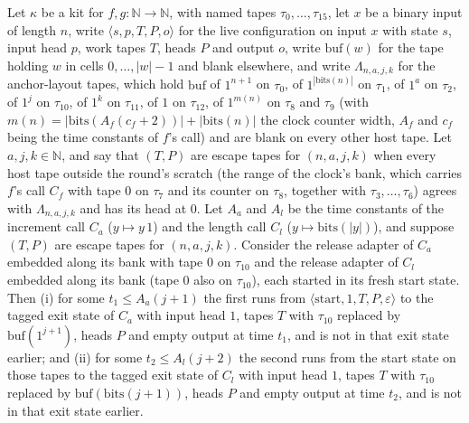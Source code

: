 \begin{theorem}
\label{Turing.NTimeDiag.qy_code_calls}
\leanok
{}
Let $\kappa$ be a kit for $f, g : \mathbb{N} \to \mathbb{N}$, with named tapes $\tau_0, \dots,
\tau_{15}$, let $x$ be a binary input of length $n$, write $\langle s, p, T, P, o\rangle$ for the
live configuration on input $x$ with state $s$, input head $p$, work tapes $T$, heads $P$ and
output $o$, write $\mathrm{buf}(w)$ for the tape holding $w$ in cells $0, \dots, |w| - 1$ and blank
elsewhere, and write $\Lambda_{n,a,j,k}$ for the anchor-layout tapes, which hold $\mathrm{buf}$ of
$1^{n+1}$ on $\tau_0$, of $1^{|\mathrm{bits}(n)|}$ on $\tau_1$, of $1^a$ on $\tau_2$, of $1^j$ on
$\tau_{10}$, of $1^k$ on $\tau_{11}$, of $1$ on $\tau_{12}$, of $1^{m(n)}$ on $\tau_8$ and $\tau_9$
(with $m(n) = |\mathrm{bits}(A_f(c_f + 2))| + |\mathrm{bits}(n)|$ the clock counter width, $A_f$
and $c_f$ being the time constants of $f$'s call) and are blank on every other host tape. Let $a,
j, k \in \mathbb{N}$, and say that $(T, P)$ are escape tapes for $(n, a, j, k)$ when every host
tape outside the round's scratch (the range of the clock's bank, which carries $f$'s call $C_f$
with tape $0$ on $\tau_7$ and its counter on $\tau_8$, together with $\tau_3, \dots, \tau_6$)
agrees with $\Lambda_{n,a,j,k}$ and has its head at $0$. Let $A_a$ and $A_l$ be the time constants
of the increment call $C_a$ ($y \mapsto y\,1$) and the length call $C_l$ ($y \mapsto
\mathrm{bits}(|y|)$), and suppose $(T, P)$ are escape tapes for $(n, a, j, k)$. Consider the
release adapter of $C_a$ embedded along its bank with tape $0$ on $\tau_{10}$ and the release
adapter of $C_l$ embedded along its bank (tape $0$ also on $\tau_{10}$), each started in its fresh
start state. Then (i) for some $t_1 \le A_a(j + 1)$ the first runs from $\langle \mathrm{start}, 1,
T, P, \varepsilon\rangle$ to the tagged exit state of $C_a$ with input head $1$, tapes $T$ with
$\tau_{10}$ replaced by $\mathrm{buf}(1^{j+1})$, heads $P$ and empty output at time $t_1$, and is
not in that exit state earlier; and (ii) for some $t_2 \le A_l(j + 2)$ the second runs from the
start state on those tapes to the tagged exit state of $C_l$ with input head $1$, tapes $T$ with
$\tau_{10}$ replaced by $\mathrm{buf}(\mathrm{bits}(j + 1))$, heads $P$ and empty output at time
$t_2$, and is not in that exit state earlier.
\end{theorem}

